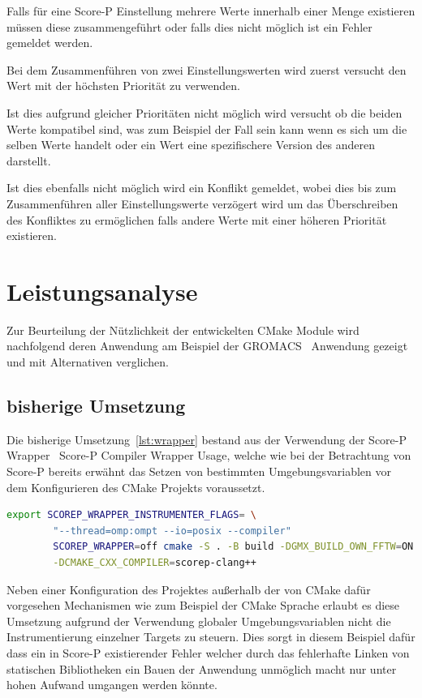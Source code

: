 \documentclass[german,proseminar,hyperref,utf8]{zihpub}
\begin{document}
    Falls für eine Score-P Einstellung mehrere Werte innerhalb einer Menge existieren müssen diese
    zusammengeführt oder falls dies nicht möglich ist ein Fehler gemeldet werden.

    Bei dem Zusammenführen von zwei Einstellungswerten wird zuerst versucht den Wert mit der höchsten
    Priorität zu verwenden.

    Ist dies aufgrund gleicher Prioritäten nicht möglich wird versucht ob die beiden Werte kompatibel
    sind, was zum Beispiel der Fall sein kann wenn es sich um die selben Werte handelt oder ein
    Wert eine spezifischere Version des anderen darstellt.

    Ist dies ebenfalls nicht möglich wird ein Konflikt gemeldet, wobei dies bis zum Zusammenführen
    aller Einstellungswerte verzögert wird um das Überschreiben des Konfliktes zu ermöglichen falls
    andere Werte mit einer höheren Priorität existieren.


    \newpage
    \section{Leistungsanalyse}
    Zur Beurteilung der Nützlichkeit der entwickelten CMake Module wird nachfolgend deren Anwendung
    am Beispiel der GROMACS~\cite{gromacs} Anwendung gezeigt und mit Alternativen verglichen.

    \subsection{bisherige Umsetzung}
    Die bisherige Umsetzung~\ref{lst:wrapper} bestand aus der Verwendung der Score-P Wrapper~
    {Score-P Compiler Wrapper Usage}, welche wie bei der Betrachtung von Score-P bereits erwähnt das
    Setzen von bestimmten Umgebungsvariablen vor dem Konfigurieren des CMake Projekts voraussetzt.

    \begin{lstlisting}[caption=Anwendung eines Score-P Wrapper bei GROMACS, language=bash, gobble=8, label=lst:wrapper]
        export SCOREP_WRAPPER_INSTRUMENTER_FLAGS= \
        "--thread=omp:ompt --io=posix --compiler"
        SCOREP_WRAPPER=off cmake -S . -B build -DGMX_BUILD_OWN_FFTW=ON \
        -DCMAKE_CXX_COMPILER=scorep-clang++
    \end{lstlisting}

    Neben einer Konfiguration des Projektes au{\ss}erhalb der von CMake dafür vorgesehen Mechanismen
    wie zum Beispiel der CMake Sprache erlaubt es diese Umsetzung aufgrund der Verwendung globaler
    Umgebungsvariablen nicht die Instrumentierung einzelner Targets zu steuern.
    Dies sorgt in diesem Beispiel dafür dass ein in Score-P existierender Fehler welcher durch das
    fehlerhafte Linken von statischen Bibliotheken ein Bauen der Anwendung unmöglich macht
    nur unter hohen Aufwand umgangen werden könnte.
\end{document}
